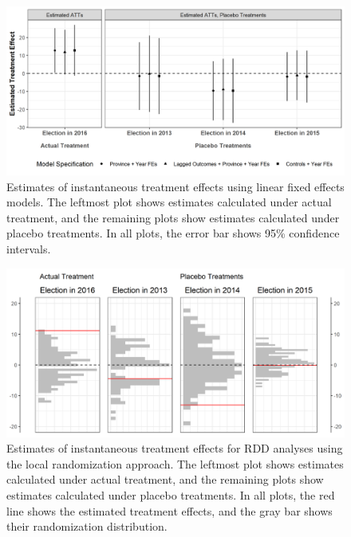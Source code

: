 \documentclass[12pt]{article}\usepackage[]{graphicx}\usepackage[]{color}
\newcommand{\1}{\mathbbm{1}}
\begin{document}
\begin{figure}[!htbp]
	\centering
	\includegraphics[width=\textwidth]{figure/181228_lfe_placebo.png}
	\captionsetup{singlelinecheck=off}
	\caption[Estimated placebo linear fixed effects treatment effects]{Estimates of instantaneous treatment effects using linear fixed effects models. The leftmost plot shows estimates calculated under actual treatment, and the remaining plots show estimates calculated under placebo treatments. In all plots, the error bar shows 95\% confidence intervals.}
	\label{fig:lfe_placebo}
\end{figure}


\begin{figure}[!htbp]
	\centering
	\includegraphics[width=\textwidth]{figure/181228_rdd_results.png}
	\captionsetup{singlelinecheck=off}
	\caption[Estimated RDD treatment effects]{Estimates of instantaneous treatment effects for RDD analyses using the local randomization approach. The leftmost plot shows estimates calculated under actual treatment, and the remaining plots show estimates calculated under placebo treatments. In all plots, the red line shows the estimated treatment effects, and the gray bar shows their randomization distribution.}
	\label{fig:rdd_placebo}
\end{figure}
\end{document}
